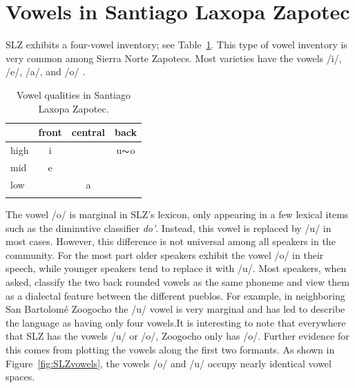 \section{Vowels in Santiago Laxopa Zapotec} \label{sec:SLZ-vowels}

SLZ exhibits a four-vowel inventory; see Table~\ref{tab:SLZ_vowel_chart}. This type of vowel inventory is very common among Sierra Norte Zapotecs. Most varieties have the vowels /i/, /e/, /a/, and /o/ \citep{nellisFortisLenisCajonos1980,jaegerInitialConsonantClusters1982,butlerh.DiccionarioZapotecoYatzachi1997,avelinoTopicsYalalagZapotec2004,longDiccionarioZapotecoSan2005,sonnenscheinDescriptiveGrammarSan2005}. 

\begin{table}[h!]
    \centering
    \caption{Vowel qualities in Santiago Laxopa Zapotec.}
    \label{tab:SLZ_vowel_chart}
    \begin{tabular}{lccc}
        \lsptoprule
        &  front& central  & back \\
        \midrule 
        high   	&  i  &     &   u$\thicksim$o \\
        mid    	&  e  &   	& 	\\
        low   	&     &  a 	&	  \\
        \lspbottomrule
    \end{tabular}
\end{table}

The vowel /o/ is marginal in SLZ's lexicon, only appearing in a few lexical items such as the diminutive classifier \textit{do'}. Instead, this vowel is replaced by /u/ in most cases. However, this difference is not universal among all speakers in the community. For the most part older speakers exhibit the vowel /o/ in their speech, while younger speakers tend to replace it with /u/. Most speakers, when asked, classify the two back rounded vowels as the same phoneme and view them as a dialectal feature between the different pueblos. For example, in neighboring San Bartolomé Zoogocho the /u/ vowel is very marginal and has led \citet{sonnenscheinDescriptiveGrammarSan2005} to describe the language as having only four vowels.It is interesting to note that everywhere that SLZ has the vowels /u/ or /o/, Zoogocho only has /o/. Further evidence for this comes from plotting the vowels along the first two formants. As shown in Figure~\ref{fig:SLZvowels}, the vowels /o/ and /u/ occupy nearly identical vowel spaces.

